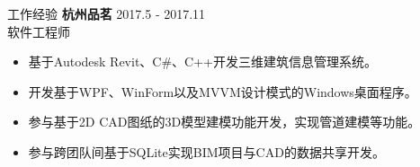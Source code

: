 \documentclass{resume} %
\begin{document}
\begin{rSection}{工作经验}
\textbf{杭州品茗} \hfill 2017.5 - 2017.11\\
软件工程师 \hfill \textit{}
\begin{itemize}
  \itemsep -3pt {}
  \item 基于Autodesk Revit、C\#、C++开发三维建筑信息管理系统。
  \item 开发基于WPF、WinForm以及MVVM设计模式的Windows桌面程序。
  \item 参与基于2D CAD图纸的3D模型建模功能开发，实现管道建模等功能。
  \item 参与跨团队间基于SQLite实现BIM项目与CAD的数据共享开发。
\end{itemize}

\end{rSection}

\end{document}
